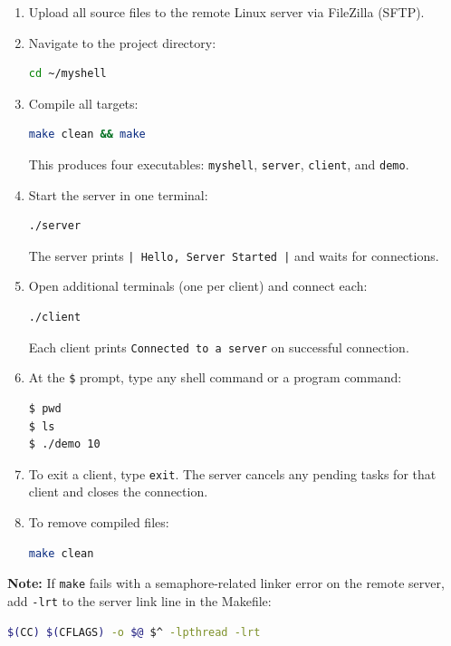 \documentclass[12pt]{article}
\begin{document}
\begin{enumerate}
    \item Upload all source files to the remote Linux server via FileZilla (SFTP).
    \item Navigate to the project directory:
\begin{lstlisting}[language=bash, numbers=none]
cd ~/myshell
\end{lstlisting}
    \item Compile all targets:
\begin{lstlisting}[language=bash, numbers=none]
make clean && make
\end{lstlisting}
    This produces four executables: \texttt{myshell}, \texttt{server}, \texttt{client},
    and \texttt{demo}.
    \item Start the server in one terminal:
\begin{lstlisting}[language=bash, numbers=none]
./server
\end{lstlisting}
    The server prints \texttt{| Hello, Server Started |} and waits for connections.
    \item Open additional terminals (one per client) and connect each:
\begin{lstlisting}[language=bash, numbers=none]
./client
\end{lstlisting}
    Each client prints \texttt{Connected to a server} on successful connection.
    \item At the \texttt{\$} prompt, type any shell command or a program command:
\begin{lstlisting}[language=bash, numbers=none]
$ pwd
$ ls
$ ./demo 10
\end{lstlisting}
    \item To exit a client, type \texttt{exit}. The server cancels any pending tasks
          for that client and closes the connection.
    \item To remove compiled files:
\begin{lstlisting}[language=bash, numbers=none]
make clean
\end{lstlisting}
\end{enumerate}

\noindent\textbf{Note:} If \texttt{make} fails with a semaphore-related linker error on
the remote server, add \texttt{-lrt} to the server link line in the Makefile:
\begin{lstlisting}[language=bash, numbers=none]
$(CC) $(CFLAGS) -o $@ $^ -lpthread -lrt
\end{lstlisting}
\end{document}
